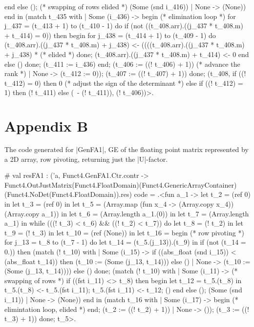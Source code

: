 \documentclass{llncs}
\begin{document}
\begin{code2}
          end else (); (* swapping of rows elided *)
          (Some (snd i_416))
       | None -> (None))
     end in
    (match t_435 with
     | Some (i_436) ->
        begin (* elimination loop *)
         for j_437 = (t_413 + 1) to (t_410 - 1) do
          if (not ((t_408.arr).((j_437 * t_408.m) + t_414) = 0)) then begin
           for j_438 = (t_414 + 1) to (t_409 - 1) do
            (t_408.arr).((j_437 * t_408.m) + j_438) <-
             ((((t_408.arr).((j_437 * t_408.m) + j_438) * (* elided *)
           done;
           (t_408.arr).((j_437 * t_408.m) + t_414) <- 0
          end else ()
         done; (t_411 := i_436)
        end;
        (t_406 := ((! t_406) + 1)) (* advance the rank *)
     | None -> (t_412 := 0));
    (t_407 := ((! t_407) + 1))
   done;
   (t_408, 
    if ((! t_412) = 0) then 0 (* adjust the sign of the determinant *)
    else if ((! t_412) = 1) then (! t_411)
    else (~- (! t_411)), (! t_406))>.
\end{code2}
\section{Appendix B}
The code generated for |GenFA1|, GE of the floating point matrix
represented by a 2D array, row pivoting, returning just the |U|-factor.
\begin{code2}
#   val resFA1 :
  ('a,
   Funct4.GenFA1.Ctr.contr ->
   Funct4.OutJustMatrix(Funct4.FloatDomain)(Funct4.GenericArrayContainer)
                       (Funct4.NoDet(Funct4.FloatDomain)).res)
  code =
  .<fun a_1 ->
   let t_2 = (ref 0) in let t_3 = (ref 0) in
   let t_5 = (Array.map (fun x_4 -> (Array.copy x_4)) (Array.copy a_1)) in
   let t_6 = (Array.length a_1.(0)) in
   let t_7 = (Array.length a_1) in
   while (((! t_3) < t_6) && ((! t_2) < t_7)) do
    let t_8 = (! t_2) in let t_9 = (! t_3) in
    let t_10 = (ref (None)) in
    let t_16 =
     begin  (* row pivoting *)
      for j_13 = t_8 to (t_7 - 1) do
       let t_14 = (t_5.(j_13)).(t_9) in
       if (not (t_14 = 0.)) then
        (match (! t_10) with
         | Some (i_15) ->
            if ((abs_float (snd i_15)) < (abs_float t_14)) then
             (t_10 := (Some (j_13, t_14)))
            else ()
         | None -> (t_10 := (Some (j_13, t_14))))
       else ()
      done;
      (match (! t_10) with
       | Some (i_11) -> (* swapping of rows *)
          if ((fst i_11) <> t_8) then begin
           let t_12 = t_5.(t_8) in
           t_5.(t_8) <- t_5.(fst i_11);
           t_5.(fst i_11) <- t_12; () end else ();
          (Some (snd i_11))
       | None -> (None))
     end in
    (match t_16 with
     | Some (i_17) ->
        begin (* elimintation loop, elided *) end;
        (t_2 := ((! t_2) + 1))
     | None -> ());
    (t_3 := ((! t_3) + 1))
   done;
   t_5>.
\end{code2}
\end{document}
